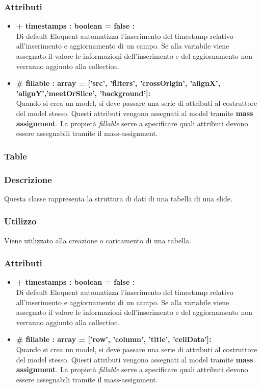 	\subsubsection*{Attributi}
	\begin{itemize}
		\item \textbf{+ timestamps : boolean = false :}\\
		Di default Eloquent automatizza l'inserimento del timestamp relativo all'inserimento e aggiornamento di un campo. Se alla variabile viene assegnato il valore le informazioni dell'inserimento e del aggiornamento non verranno aggiunto alla collection.
		\item \textbf{\# fillable : array = [’src’, ’filters’, ’crossOrigin’, ’alignX’, ’alignY’,’meetOrSlice’, ’background’]:}\\
		Quando si crea un model, si deve passare una serie di attributi al costruttore del model stesso. Questi attributi vengono assegnati al model tramite \textbf{mass assignment}. La propietà \textit{fillable} serve a specificare quali attributi devono essere assegnabili tramite il mass-assignment.

	\end{itemize}

\newpage
\subsubsection{Table}


	\subsubsection*{Descrizione}
	Questa classe rappresenta la struttura di dati di una tabella di una slide.
	
	\subsubsection*{Utilizzo}
	Viene utilizzato alla creazione o caricamento di una tabella.
	
	\subsubsection*{Attributi}
	\begin{itemize}
		\item \textbf{+ timestamps : boolean = false :}\\
		Di default Eloquent automatizza l'inserimento del timestamp relativo all'inserimento e aggiornamento di un campo. Se alla variabile viene assegnato il valore le informazioni dell'inserimento e del aggiornamento non verranno aggiunto alla collection.
		\item \textbf{\# fillable : array = [’row’, ’column’, ’title’, ’cellData’]:}\\
		Quando si crea un model, si deve passare una serie di attributi al costruttore del model stesso. Questi attributi vengono assegnati al model tramite \textbf{mass assignment}. La propietà \textit{fillable} serve a specificare quali attributi devono essere assegnabili tramite il mass-assignment.

	\end{itemize}